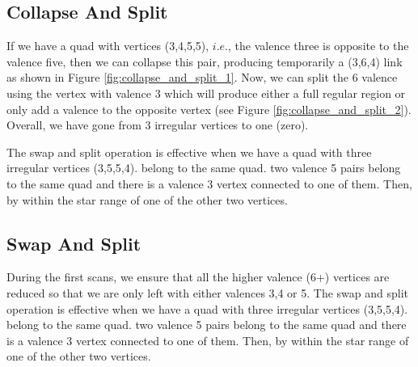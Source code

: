 \documentclass[titlepage]{article}
\begin{document}
 \subsection{Collapse And Split} 
  If we have a quad with vertices (3,4,5,5), $i.e.$, the valence three is opposite to the valence five, 
  then we can collapse this pair, producing temporarily a (3,6,4) link as shown in Figure \ref{fig:collapse_and_split_1}. 
  Now, we can split the  6 valence using the vertex with valence 3 which will produce either a full regular region 
  or only add a valence to the opposite vertex (see Figure \ref{fig:collapse_and_split_2}). Overall, we have
   gone from 3 irregular vertices to one (zero). 
   
   
   
   
  The swap and split operation is effective when we have a quad with three irregular vertices (3,5,5,4). 
  belong to the same quad. two valence 5 pairs belong to the same quad and 
  there is a valence 3 vertex connected to one of them. Then, by within the star range of one of the other two vertices. 



  \subsection{Swap And Split } 
  
  During the first scans, we ensure that all the higher valence (6+) vertices are reduced so that we are 
  only left with either valences 3,4 or 5. 
  The swap and split operation is effective when we have a quad with three irregular vertices (3,5,5,4). 
  belong to the same quad. two valence 5 pairs belong to the same quad and 
  there is a valence 3 vertex connected to one of them. Then, by within the star range of one of the other two vertices. 
  
  
  
  
  
  
  
  
  
  
  
\end{document}
